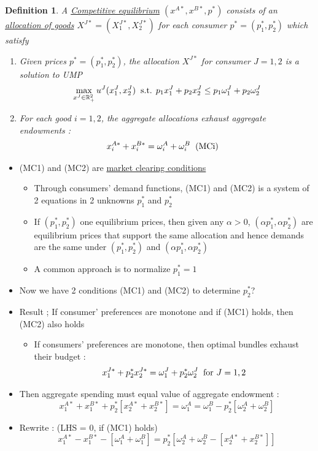 \documentclass[twoside]{article}
\newtheorem{definition}[theorem]{Definition}
\begin{document}
\begin{definition} A \underline{Competitive equilibrium} \((x^{A*}, x^{B*}, p^*)\) consists of an \underline{allocation of goods} \(X^{J*} = (X_1^{J*}, X_2^{J*}) \) for each consumer \(p^* = (p_1^*, p_2^*)\) which satisfy 
\begin{enumerate}
\item Given prices \(p^* = (p_1^*, p_2^*)\), the allocation \(X^{J*}\) for consumer \(J = 1, 2\) is a solution to UMP
\[\max_{x^J \in \mathbb{R}^2_+} u^J (x_1^J, x_2^J)  \hspace{0.2cm} \text{s.t. }  p_1x_1^J + p_2x_2^J \leq p_1 \omega^J_1 + p_2 \omega_2^J \]
\item For each good \(i = 1, 2\), the aggregate allocations exhaust aggregate endowments : 
\[\begin{aligned}x_i^{A*} + x_i^{B*} & = \omega_i^{A} + \omega_i^B \hspace{0.2cm}\text{(MCi)} \end{aligned}\]
\end{enumerate}
\end{definition}
\begin{itemize}
\item (MC1) and (MC2) are \underline{market clearing conditions}
\begin{itemize}
\item Through consumers' demand functions, (MC1) and (MC2) is a system of 2 equations in 2 unknowns \(p_1^*\) and \(p_2^*\)
\item If \((p_1^*, p_2^*)\) one equilibrium prices, then given any \(\alpha > 0\), \((\alpha p_1^*, \alpha p_2^*)\) are equilibrium prices that support the same allocation and hence demands are the same under \((p_1^*, p_2^*)\)  and \((\alpha p_1^*, \alpha p_2^*)\) 
\item A common approach is to normalize \(p_1^* = 1\)
\end{itemize}
\item Now we have 2 conditions (MC1) and (MC2) to determine \(p_2^*\)? 
\item Result ; If consumer' preferences are monotone and if (MC1) holds, then (MC2) also holds
\begin{itemize}
\item If consumers' preferences are monotone, then optimal bundles exhaust their budget : 
\[x_1^{J*} + p_2^* x_2^{J*} = \omega_1^J + p_2^* \omega_2^J \hspace{0.2cm} \text{for } J = 1, 2\]
\end{itemize}
\item Then aggregate spending must equal value of aggregate endowment : 
\[x_1^{A*} + x_1^{B*} + p_2^* [ x_2^{A*} + x_2^{B*} ] = \omega^A_1 = \omega_1^B - p_2^* [\omega_2^A + \omega_2^B] \]
\item Rewrite : (LHS = 0, if (MC1) holds)
\[x_1^{A*} - x_1^{B*} - [\omega_1^A + \omega_1^B] = p_2^* [\omega_2^A + \omega_2^B - [x_2^{A*} + x_2^{B*}]]\]
\end{itemize}
\end{document}
